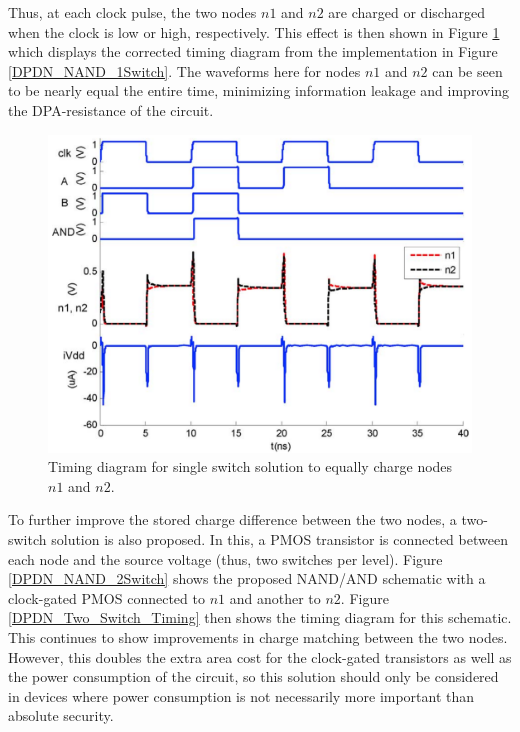 \documentclass[conference, 12pt]{IEEEtran}
\newcommand{\x}{1}						%
\begin{document}
			Thus, at each clock pulse, the two nodes $n1$ and $n2$ are charged or discharged when the clock is low or high, respectively. This effect is then shown in Figure \ref{DPDN_Single_Switch_Timing} which displays the corrected timing diagram from the implementation in Figure \ref{DPDN_NAND_1Switch}. The waveforms here for nodes $n1$ and $n2$ can be seen to be nearly equal the entire time, minimizing information leakage and improving the DPA-resistance of the circuit. 

			\begin{figure}[tbp]
				\centering
				\includegraphics[width=\x\linewidth]{ReportFiles/DPDN_Single_Switch_Timing.png}
				\caption{Timing diagram for single switch solution to equally charge nodes $n1$ and $n2$.\cite{b5}}
				\label{DPDN_Single_Switch_Timing}
			\end{figure}

			To further improve the stored charge difference between the two nodes, a two-switch solution is also proposed. In this, a PMOS transistor is connected between each node and the source voltage (thus, two switches per level). Figure \ref{DPDN_NAND_2Switch} shows the proposed NAND/AND schematic with a clock-gated PMOS connected to $n1$ and another to $n2$. Figure \ref{DPDN_Two_Switch_Timing} then shows the timing diagram for this schematic. This continues to show improvements in charge matching between the two nodes. However, this doubles the extra area cost for the clock-gated transistors as well as the power consumption of the circuit, so this solution should only be considered in devices where power consumption is not necessarily more important than absolute security. 
\end{document}
